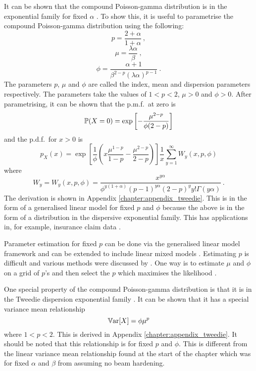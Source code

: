 It can be shown that the compound Poisson-gamma distribution is in the exponential family for fixed $\alpha$ \citep{jorgensen1987exponential}. To show this, it is useful to parametrise the compound Poisson-gamma distribution using the following:
\begin{equation}
  p=\frac{2+\alpha}{1+\alpha}
  \ ,
\end{equation}
\begin{equation}
  \mu=\frac{\lambda\alpha}{\beta}
  \ ,
\end{equation}
\begin{equation}
  \phi = \frac{\alpha+1}{\beta^{2-p}(\lambda\alpha)^{p-1}}
  \ .
\end{equation}
The parameters $p$, $\mu$ and $\phi$ are called the index, mean and dispersion parameters respectively. The parameters take the values of $1<p<2$, $\mu>0$ and $\phi>0$. After parametrising, it can be shown that the p.m.f.~at zero is
\begin{equation}
  \operatorname{\mathbb{P}}(X=0) = \exp
  \left[
      -\frac{\mu^{2-p}}{\phi(2-p)}
  \right]
\end{equation}
and the p.d.f.~for $x>0$ is
\begin{equation}
  p_X(x) = 
  \exp\left[
    \frac{1}{\phi}
    \left(
      x\frac{\mu^{1-p}}{1-p}-\frac{\mu^{2-p}}{2-p}
    \right)
  \right]
  \frac{1}{x}
  \sum_{y=1}^{\infty}W_y(x,p,\phi)
\end{equation}
where
\begin{equation}
  W_y = W_y(x,p,\phi)=\frac{x^{y\alpha}}{\phi^{y(1+\alpha)}(p-1)^{y\alpha}(2-p)^yy!\Gamma(y\alpha)}
  \ .
\end{equation}
The derivation is shown in Appendix \ref{chapter:appendix_tweedie}. This is in the form of a generalised linear model \citep{nelder1972generalized, nelder1972generalized_2, mccullagh1984generalized} for fixed $p$ and $\phi$ because the above is in the form of a distribution in the dispersive exponential family. This has applications in, for example, insurance claim data \citep{jorgensen1994fitting, smyth2002fitting}.

Parameter estimation for fixed $p$ can be done via the generalised linear model framework and can be extended to include linear mixed models \citep{zhang2013likelihood}. Estimating $p$ is difficult and various methods were discussed by \cite{zhang2013likelihood}. One way is to estimate $\mu$ and $\phi$ on a grid of $p$'s and then select the $p$ which maximises the likelihood \citep{dunn2005series}.

One special property of the compound Poisson-gamma distribution is that it is in the Tweedie dispersion exponential family \citep{jorgensen1987exponential}. It can be shown that it has a special variance mean relationship
\begin{equation}
  \operatorname{\mathbb{V}ar}[X] = \phi \mu^p
\end{equation}
where $1<p<2$. This is derived in Appendix \ref{chapter:appendix_tweedie}. It should be noted that this relationship is for fixed $p$ and $\phi$. This is different from the linear variance mean relationship found at the start of the chapter which was for fixed $\alpha$ and $\beta$ from assuming no beam hardening.

